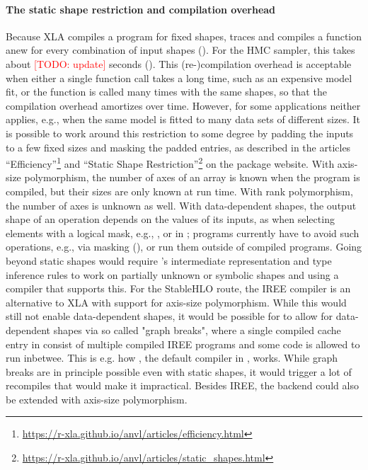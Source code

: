 \documentclass[article,shortnames]{jss}
\begin{document}
\paragraph{The static shape restriction and compilation overhead}
Because XLA compiles a program for fixed shapes,  traces and compiles a function anew for every combination of input shapes ().
For the HMC sampler, this takes about \textcolor{red}{[TODO: update]} seconds ().
This (re-)compilation overhead is acceptable when either a single function call takes a long time, such as an expensive model fit, or the function is called many times with the same shapes, so that the compilation overhead amortizes over time.
However, for some applications neither applies, e.g., when the same model is fitted to many data sets of different sizes.
It is possible to work around this restriction to some degree by padding the inputs to a few fixed sizes and masking the padded entries, as described in the articles ``Efficiency''\footnote{\url{https://r-xla.github.io/anvl/articles/efficiency.html}} and ``Static Shape Restriction''\footnote{\url{https://r-xla.github.io/anvl/articles/static_shapes.html}} on the package website.
With axis-size polymorphism, the number of axes of an array is known when the program is compiled, but their sizes are only known at run time.
With rank polymorphism, the number of axes is unknown as well.
With data-dependent shapes, the output shape of an operation depends on the values of its inputs, as when selecting elements with a logical mask, e.g., , or in ; programs currently have to avoid such operations, e.g., via masking (), or run them outside of compiled programs.
Going beyond static shapes would require 's intermediate representation and type inference rules to work on partially unknown or symbolic shapes and using a compiler that supports this.
For the StableHLO route, the IREE compiler \citep{ref-iree} is an alternative to XLA with support for axis-size polymorphism.
While this would still not enable data-dependent shapes, it would be possible for  to allow for data-dependent shapes via so called "graph breaks", where a single compiled cache entry in  consist of multiple compiled IREE programs and some  code is allowed to run inbetwee. This is e.g. how , the default compiler in , works.
While graph breaks are in principle possible even with static shapes, it would trigger a lot of recompiles that would make it impractical.
Besides IREE, the  backend could also be extended with axis-size polymorphism.
\end{document}
